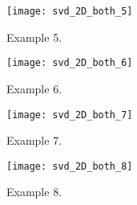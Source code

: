 \documentclass[11pt,titlepage,fleqn]{article}
\begin{document}
\clearpage\pagebreak
\begin{figure}
\hspace{-1cm}
\texttt{[image: svd\_2D\_both\_5]}
\caption[]
{{
Example 5.
\label{fig:ex5}
}}
\end{figure}

\clearpage\pagebreak
\begin{figure}
\hspace{-1cm}
\texttt{[image: svd\_2D\_both\_6]}
\caption[]
{{
Example 6.
\label{fig:ex6}
}}
\end{figure}

\clearpage\pagebreak
\begin{figure}
\hspace{-1cm}
\texttt{[image: svd\_2D\_both\_7]}
\caption[]
{{
Example 7.
\label{fig:ex7}
}}
\end{figure}

\clearpage\pagebreak
\begin{figure}
\hspace{-1cm}
\texttt{[image: svd\_2D\_both\_8]}
\caption[]
{{
Example 8.
\label{fig:ex8}
}}
\end{figure}

\end{document}
